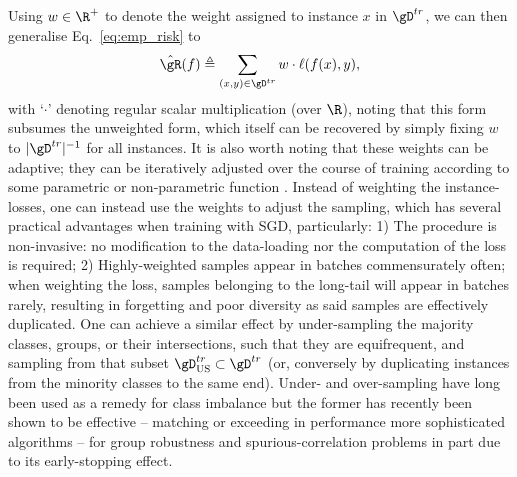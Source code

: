 Using \( w \in \R^+ \) to denote the weight assigned to instance \(x\) in \( \gD^{tr} \), we can
then generalise Eq.~\ref{eq:emp_risk} to
\begin{equation*} \label{eq:emp_risk_weighted} \hat{\gR}(f) \triangleq \sum_{(x, y) \in \gD^{tr}} w
\cdot \ell (f(x), y), \end{equation*}
with `\( \cdot \)' denoting regular scalar multiplication (over \(\R\)), noting that this form
subsumes the unweighted form, which itself can be recovered by simply fixing \(w\) to \(
|\gD^{tr}|^{-1} \) for all instances.
%
It is also worth noting that these weights can be adaptive; they can be iteratively adjusted over
the course of training according to some parametric or non-parametric function
\citep{wang2021importance}.
%
Instead of weighting the instance-losses, one can instead use the weights to adjust the sampling,
which has several practical advantages when training with \ac{SGD}, particularly: 
1) The procedure is non-invasive: no modification to the data-loading nor the computation of the
loss is required;
%
2) Highly-weighted samples appear in batches commensurately often; when weighting the loss, samples
belonging to the long-tail will appear in batches rarely, resulting in forgetting and poor
diversity as said samples are effectively duplicated.
One can achieve a similar effect by under-sampling the majority classes, groups, or their
intersections, such that they are equifrequent, and \iid{} sampling from that subset \(
\gD^{tr}_{\text{US}} \subset \gD^{tr} \) (or, conversely by duplicating instances from the minority
classes to the same end).
Under- and over-sampling have long been used as a remedy for class imbalance
\citep{chawla2002smote} but the former has recently been shown to be effective -- matching or
exceeding in performance more sophisticated algorithms -- for group robustness and
spurious-correlation problems \citep{sagawa2020investigation, idrissi2022simple} in part due to its
early-stopping effect.

